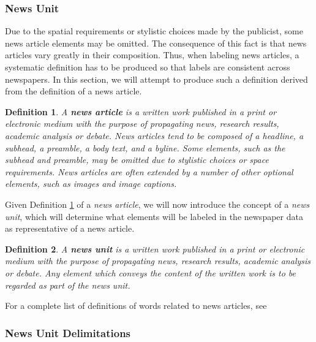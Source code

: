\documentclass[oneside, english, bibtex]{kththesis}
\begin{document}
\subsubsection{News Unit}
\label{subsub:labelnewsunit}

Due to the spatial requirements or stylistic choices made by the publicist, some news article elements may be omitted.
The consequence of this fact is that news articles vary greatly in their composition.
Thus, when labeling news articles, a systematic definition has to be produced so that labels are consistent across newspapers.
In this section, we will attempt to produce such a definition derived from the definition of a news article.

\newtheorem{lemma}{Lemma}[chapter]
\newcommand{\lemmaautorefname}{Lemma}
\newtheorem{definition}[lemma]{Definition}
\newcommand{\definitionautorefname}{Definition}

\begin{definition}
\label{newsarticle}
A \textbf{news article} is a written work published in a print or electronic medium with the purpose of propagating news, research results, academic analysis or debate.
News articles tend to be composed of a headline, a subhead, a preamble, a body text, and a byline.
Some elements, such as the subhead and preamble, may be omitted due to stylistic choices or space requirements.
News articles are often extended by a number of other optional elements, such as images and image captions.
\end{definition}


Given Definition \ref{newsarticle} of a \textit{news article}, we will now introduce the concept of a \textit{news unit}, which will determine what elements will be labeled in the newspaper data as representative of a news article.

\begin{definition}
\label{newsunit}
A \textbf{news unit} is a written work published in a print or electronic medium with the purpose of propagating news, research results, academic analysis or debate. Any element which conveys the content of the written work is to be regarded as part of the news unit.
\end{definition}

For a complete list of definitions of words related to news articles, see ~

\subsubsection{News Unit Delimitations}
\label{subsub:labelnewsdelim}
\end{document}
